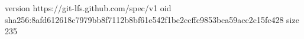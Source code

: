 version https://git-lfs.github.com/spec/v1
oid sha256:8afd612618c7979bb8f7112b8bf61e542f1bc2ccffc9853bca59acc2c15fc428
size 235
